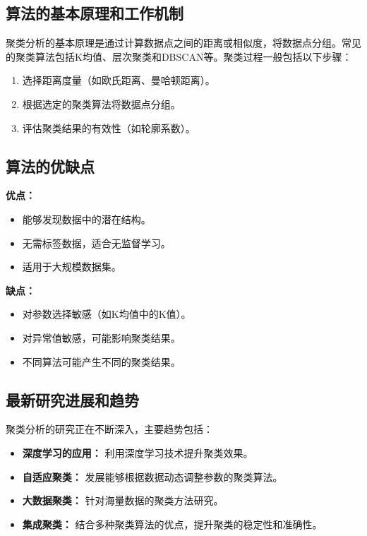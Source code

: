 \subsection*{算法的基本原理和工作机制}
聚类分析的基本原理是通过计算数据点之间的距离或相似度，将数据点分组。常见的聚类算法包括K均值、层次聚类和DBSCAN等。聚类过程一般包括以下步骤：
\begin{enumerate}
    \item 选择距离度量（如欧氏距离、曼哈顿距离）。
    \item 根据选定的聚类算法将数据点分组。
    \item 评估聚类结果的有效性（如轮廓系数）。
\end{enumerate}

\subsection*{算法的优缺点}
\textbf{优点：}
\begin{itemize}
    \item 能够发现数据中的潜在结构。
    \item 无需标签数据，适合无监督学习。
    \item 适用于大规模数据集。
\end{itemize}

\textbf{缺点：}
\begin{itemize}
    \item 对参数选择敏感（如K均值中的K值）。
    \item 对异常值敏感，可能影响聚类结果。
    \item 不同算法可能产生不同的聚类结果。
\end{itemize}

\subsection*{最新研究进展和趋势}
聚类分析的研究正在不断深入，主要趋势包括：
\begin{itemize}
    \item \textbf{深度学习的应用：} 利用深度学习技术提升聚类效果。
    \item \textbf{自适应聚类：} 发展能够根据数据动态调整参数的聚类算法。
    \item \textbf{大数据聚类：} 针对海量数据的聚类方法研究。
    \item \textbf{集成聚类：} 结合多种聚类算法的优点，提升聚类的稳定性和准确性。
\end{itemize}
